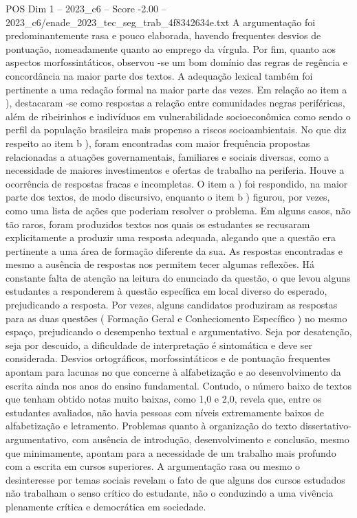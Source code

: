 \begin{textsample}{POS Dim 1 – 2023\_c6 – Score -2.00 – 2023\_c6/enade\_2023\_tec\_seg\_trab\_4f8342634e.txt}
A argumentação foi predominantemente rasa e pouco elaborada, havendo frequentes desvios de pontuação, nomeadamente quanto ao emprego da vírgula.
Por fim, quanto aos aspectos morfossintáticos, observou -se um bom domínio das regras de regência e concordância na maior parte dos textos.
A adequação lexical também foi pertinente a uma redação formal na maior parte das vezes.
Em relação ao item a ), destacaram -se como respostas a relação entre comunidades negras periféricas, além de ribeirinhos e indivíduos em vulnerabilidade socioeconômica como sendo o perfil da população brasileira mais propenso a riscos socioambientais.
No que diz respeito ao item b ), foram encontradas com maior frequência propostas relacionadas a atuações governamentais, familiares e sociais diversas, como a necessidade de maiores investimentos e ofertas de trabalho na periferia.
Houve a ocorrência de respostas fracas e incompletas.
O item a ) foi respondido, na maior parte dos textos, de modo discursivo, enquanto o item b ) figurou, por vezes, como uma lista de ações que poderiam resolver o problema.
Em alguns casos, não tão raros, foram produzidos textos nos quais os estudantes se recusaram explicitamente a produzir uma resposta adequada, alegando que a questão era pertinente a uma área de formação diferente da sua.
As respostas encontradas e mesmo a ausência de respostas nos permitem tecer algumas reflexões.
Há constante falta de atenção na leitura do enunciado da questão, o que levou alguns estudantes a responderem à questão específica em local diverso do esperado, prejudicando a resposta.
Por vezes, alguns candidatos produziram as respostas para as duas questões ( Formação Geral e Conheciomento Específico ) no mesmo espaço, prejudicando o desempenho textual e argumentativo.
Seja por desatenção, seja por descuido, a dificuldade de interpretação é sintomática e deve ser considerada.
Desvios ortográficos, morfossintáticos e de pontuação frequentes apontam para lacunas no que concerne à alfabetização e ao desenvolvimento da escrita ainda nos anos do ensino fundamental.
Contudo, o número baixo de textos que tenham obtido notas muito baixas, como 1,0 e 2,0, revela que, entre os estudantes avaliados, não havia pessoas com níveis extremamente baixos de alfabetização e letramento.
Problemas quanto à organização do texto dissertativo-argumentativo, com ausência de introdução, desenvolvimento e conclusão, mesmo que minimamente, apontam para a necessidade de um trabalho mais profundo com a escrita em cursos superiores.
A argumentação rasa ou mesmo o desinteresse por temas sociais revelam o fato de que alguns dos cursos estudados não trabalham o senso crítico do estudante, não o conduzindo a uma vivência plenamente crítica e democrática em sociedade.

\end{textsample}
